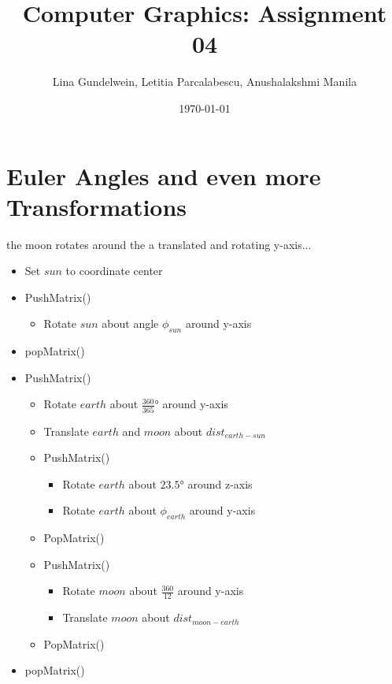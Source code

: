 \documentclass{article}
\title{Computer Graphics: Assignment 04} %
\author{Lina Gundelwein, Letitia Parcalabescu, Anushalakshmi Manila} %
\date{\today} %
\begin{document}
\maketitle 

\section{Euler Angles and even more Transformations}
the moon rotates around the a translated and rotating y-axis...
\begin{itemize}
\item Set $sun$ to coordinate center
\item PushMatrix()
\begin{itemize}
\item Rotate $sun$ about angle $\phi_{sun}$ around y-axis
\end{itemize}
\item popMatrix()
\end{itemize}


\begin{itemize}
\item PushMatrix()
\begin{itemize}
\item Rotate $earth$ about $\frac{360}{365}$° around y-axis
\item Translate $earth$ and $moon$ about $dist_{earth-sun}$
\item PushMatrix()
\begin{itemize}
\item Rotate $earth$ about $23.5°$ around z-axis
\item Rotate $earth$ about $\phi_{earth}$ around y-axis
\end{itemize}
\item PopMatrix()
\item PushMatrix()
\begin{itemize}
\item Rotate $moon$ about $\frac{360}{12}$ around y-axis
\item Translate $moon$ about $dist_{moon-earth}$
\end{itemize}
\item PopMatrix()
\end{itemize}

\item popMatrix()
\end{itemize}
\end{document}
